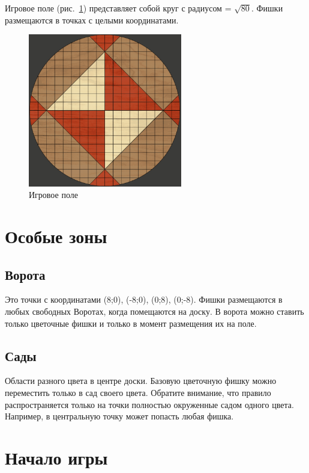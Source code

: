 \documentclass[a4paper,12pt]{diplom}
\begin{document}
Игровое поле (рис.~\ref{fig:1}) представляет собой круг с радиусом = $\sqrt{80}$. Фишки размещаются в точках с целыми координатами.

\begin{figure}[!ht]
	\centering
	\includegraphics[width=0.6\textwidth]{pictures/board.png}
	\caption{Игровое поле}
	\label{fig:1}
\end{figure}

\section{Особые зоны}

\subsection{Ворота}

Это точки с координатами (8;0), (-8;0), (0;8), (0;-8). Фишки размещаются в любых свободных Воротах, когда помещаются на доску. В ворота можно ставить только цветочные фишки и только в момент размещения их на поле.

\subsection{Сады}
Области разного цвета в центре доски. Базовую цветочную фишку можно переместить только в сад своего цвета. Обратите внимание, что правило распространяется только на точки полностью окруженные садом одного цвета. Например, в центральную точку может попасть любая фишка.

\section{Начало игры}
\end{document}
